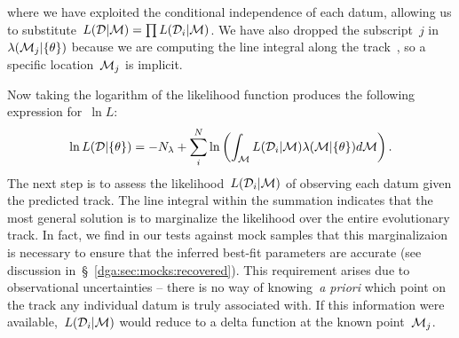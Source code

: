 where we have exploited the conditional independence of each datum, allowing us
to substitute~$L(\mathcal{D} | \mathcal{M}) = \prod L(\mathcal{D}_i |
\mathcal{M})$.
We have also dropped the subscript~$j$ in~$\lambda(\mathcal{M}_j | \{\theta\})$
because we are computing the line integral along the track~, so a
specific location~$\mathcal{M}_j$ is implicit.
\par
Now taking the logarithm of the likelihood function produces the following
expression for~$\ln L$:
\begin{equation}
\ln L(\mathcal{D} | \{\theta\}) = -N_\lambda + \sum_i^N \ln \left(
\int_{\mathcal{M}} L(\mathcal{D}_i | \mathcal{M})\lambda(\mathcal{M} | \{\theta\})
d\mathcal{M}
\right).
\label{dga:eq:lnL_with_integral}
\end{equation}
The next step is to assess the likelihood~$L(\mathcal{D}_i | \mathcal{M})$ of
observing each datum given the predicted track.
The line integral within the summation indicates that the most general solution
is to marginalize the likelihood over the entire evolutionary track.
In fact, we find in our tests against mock samples that this marginalizaion is necessary to
ensure that the inferred best-fit parameters are accurate (see discussion
in~\S~\ref{dga:sec:mocks:recovered}).
This requirement arises due to observational uncertainties -- there is no way
of knowing~\textit{a priori} which point on the track any individual datum is
truly associated with.
If this information were available,~$L(\mathcal{D}_i | \mathcal{M})$ would reduce
to a delta function at the known point~$\mathcal{M}_j$.

